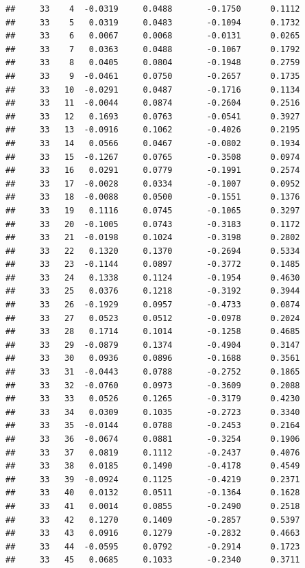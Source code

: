 \documentclass[
]{article}
\begin{document}
\begin{verbatim}
##     33    4  -0.0319     0.0488       -0.1750      0.1112  
##     33    5   0.0319     0.0483       -0.1094      0.1732  
##     33    6   0.0067     0.0068       -0.0131      0.0265  
##     33    7   0.0363     0.0488       -0.1067      0.1792  
##     33    8   0.0405     0.0804       -0.1948      0.2759  
##     33    9  -0.0461     0.0750       -0.2657      0.1735  
##     33   10  -0.0291     0.0487       -0.1716      0.1134  
##     33   11  -0.0044     0.0874       -0.2604      0.2516  
##     33   12   0.1693     0.0763       -0.0541      0.3927  
##     33   13  -0.0916     0.1062       -0.4026      0.2195  
##     33   14   0.0566     0.0467       -0.0802      0.1934  
##     33   15  -0.1267     0.0765       -0.3508      0.0974  
##     33   16   0.0291     0.0779       -0.1991      0.2574  
##     33   17  -0.0028     0.0334       -0.1007      0.0952  
##     33   18  -0.0088     0.0500       -0.1551      0.1376  
##     33   19   0.1116     0.0745       -0.1065      0.3297  
##     33   20  -0.1005     0.0743       -0.3183      0.1172  
##     33   21  -0.0198     0.1024       -0.3198      0.2802  
##     33   22   0.1320     0.1370       -0.2694      0.5334  
##     33   23  -0.1144     0.0897       -0.3772      0.1485  
##     33   24   0.1338     0.1124       -0.1954      0.4630  
##     33   25   0.0376     0.1218       -0.3192      0.3944  
##     33   26  -0.1929     0.0957       -0.4733      0.0874  
##     33   27   0.0523     0.0512       -0.0978      0.2024  
##     33   28   0.1714     0.1014       -0.1258      0.4685  
##     33   29  -0.0879     0.1374       -0.4904      0.3147  
##     33   30   0.0936     0.0896       -0.1688      0.3561  
##     33   31  -0.0443     0.0788       -0.2752      0.1865  
##     33   32  -0.0760     0.0973       -0.3609      0.2088  
##     33   33   0.0526     0.1265       -0.3179      0.4230  
##     33   34   0.0309     0.1035       -0.2723      0.3340  
##     33   35  -0.0144     0.0788       -0.2453      0.2164  
##     33   36  -0.0674     0.0881       -0.3254      0.1906  
##     33   37   0.0819     0.1112       -0.2437      0.4076  
##     33   38   0.0185     0.1490       -0.4178      0.4549  
##     33   39  -0.0924     0.1125       -0.4219      0.2371  
##     33   40   0.0132     0.0511       -0.1364      0.1628  
##     33   41   0.0014     0.0855       -0.2490      0.2518  
##     33   42   0.1270     0.1409       -0.2857      0.5397  
##     33   43   0.0916     0.1279       -0.2832      0.4663  
##     33   44  -0.0595     0.0792       -0.2914      0.1723  
##     33   45   0.0685     0.1033       -0.2340      0.3711  

\end{verbatim}
\end{document}
